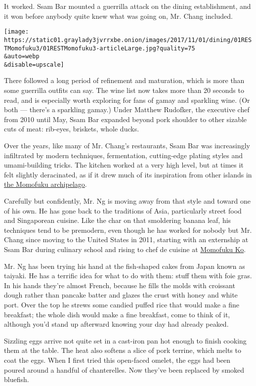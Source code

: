 It worked. Ssam Bar mounted a guerrilla attack on the dining
establishment, and it won before anybody quite knew what was going on,
Mr. Chang included.

\texttt{[image: https://static01.graylady3jvrrxbe.onion/images/2017/11/01/dining/01RESTMomofuku3/01RESTMomofuku3-articleLarge.jpg?quality=75\\\&auto=webp\\\&disable=upscale]}

There followed a long period of refinement and maturation, which is more
than some guerrilla outfits can say. The wine list now takes more than
20 seconds to read, and is especially worth exploring for fans of gamay
and sparkling wine. (Or both --- there's a sparkling gamay.) Under
Matthew Rudofker, the executive chef from 2010 until May, Ssam Bar
expanded beyond pork shoulder to other sizable cuts of meat: rib-eyes,
briskets, whole ducks.

Over the years, like many of Mr. Chang's restaurants, Ssam Bar was
increasingly infiltrated by modern techniques, fermentation,
cutting-edge plating styles and umami-building tricks. The kitchen
worked at a very high level, but at times it felt slightly deracinated,
as if it drew much of its inspiration from other islands in
\href{https://momofuku.com/}{the Momofuku archipelago}.

Carefully but confidently, Mr. Ng is moving away from that style and
toward one of his own. He has gone back to the traditions of Asia,
particularly street food and Singaporean cuisine. Like the char on that
smoldering banana leaf, his techniques tend to be premodern, even though
he has worked for nobody but Mr. Chang since moving to the United States
in 2011, starting with an externship at Ssam Bar during culinary school
and rising to chef de cuisine at
\href{https://www.nytimes3xbfgragh.onion/2015/10/14/dining/restaurant-review-momofuku-ko-east-village.html?_r=0}{Momofuku
Ko}.

Mr. Ng has been trying his hand at the fish-shaped cakes from Japan
known as taiyaki. He has a terrific idea for what to do with them: stuff
them with foie gras. In his hands they're almost French, because he
fills the molds with croissant dough rather than pancake batter and
glazes the crust with honey and white port. Over the top he strews some
candied puffed rice that would make a fine breakfast; the whole dish
would make a fine breakfast, come to think of it, although you'd stand
up afterward knowing your day had already peaked.

Sizzling eggs arrive not quite set in a cast-iron pan hot enough to
finish cooking them at the table. The heat also softens a slice of pork
terrine, which melts to coat the eggs. When I first tried this
open-faced omelet, the eggs had been poured around a handful of
chanterelles. Now they've been replaced by smoked bluefish.

